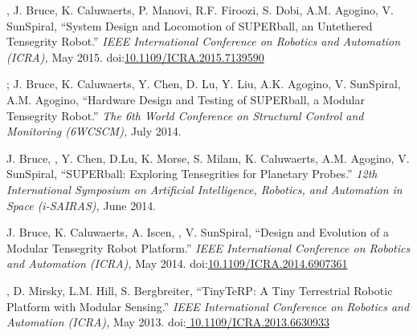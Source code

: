 \documentclass[letterpaper]{deedy-resume} %
\newcommand\doilink[1]{\href{http://dx.doi.org/#1}{#1}}
\newcommand\doi[1]{doi:\doilink{#1}}
\begin{document}
{\begin{etaremune}[itemsep=0.1cm]
\item \underline{{}}, J. Bruce, K. Caluwaerts, P. Manovi, R.F. Firoozi, S. Dobi, A.M. Agogino, V. SunSpiral, ``System Design and Locomotion of SUPERball, an Untethered Tensegrity Robot.'' {\it IEEE International Conference on Robotics and Automation (ICRA),} May 2015. \doi{10.1109/ICRA.2015.7139590}

\item \underline{{}}; J. Bruce, K. Caluwaerts, Y. Chen, D. Lu, Y. Liu, A.K. Agogino, V. SunSpiral, A.M. Agogino, ``Hardware Design and Testing of SUPERball, a Modular Tensegrity Robot.'' {\it The 6th World Conference on Structural Control and Monitoring (6WCSCM),} July 2014.

\item J. Bruce, \underline{{}}, Y. Chen, D.Lu, K. Morse, S. Milam, K. Caluwaerts, A.M. Agogino, V. SunSpiral, ``SUPERball: Exploring Tensegrities for Planetary Probes.'' {\it 12th International Symposium on Artificial Intelligence, Robotics, and Automation in Space (i-SAIRAS),} June 2014.

\item J. Bruce, K. Caluwaerts, A. Iscen, \underline{{}}, V. SunSpiral, ``Design and Evolution of a Modular Tensegrity Robot Platform.'' {\it IEEE International Conference on Robotics and Automation (ICRA),} May 2014. \doi{10.1109/ICRA.2014.6907361}

\item \underline{{}}, D. Mirsky, L.M. Hill, S. Bergbreiter, ``TinyTeRP: A Tiny Terrestrial Robotic Platform with Modular Sensing.'' {\it IEEE International Conference on Robotics and Automation (ICRA),} May 2013. \doi{ 10.1109/ICRA.2013.6630933}

\end{etaremune}





}
\end{document}
